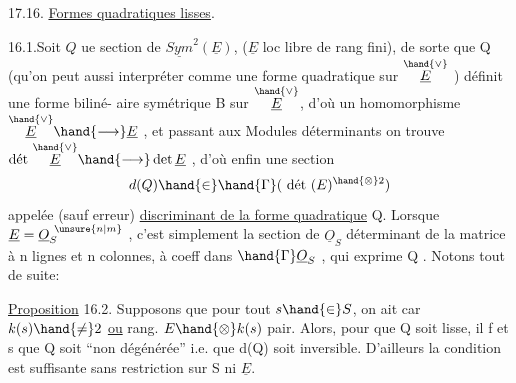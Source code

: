   

17.16. \uline{Formes quadratiques lisses}.

16.1.Soit $Q$ ue section de $\underline{Sym}^2(\underline{E})$, ($\underline{E}$ loc libre de rang fini),
de sorte que Q  (qu'on peut aussi interpréter comme une forme
quadratique sur $\overset{\hand{\vee}}{\underline{E}}$ )  définit une forme biliné-%
aire symétrique B sur $\overset{\hand{\vee}}{\underline{E}}$, d'où un homomorphisme $\overset{\hand{\vee}}{\underline{E}} \hand{\longrightarrow} \underline{E}$ , et passant aux
Modules déterminants on trouve $\text{dét}\ \overset{\hand{\vee}}{\underline{E}} \hand{\longrightarrow} \det \underline{E}$ , d'où enfin une section
\[ d(Q) \hand{\in} \hand{\Gamma}(\ \text{dét}\ (E)^{\hand{\otimes} 2}) \]
appelée (sauf erreur) \uline{discriminant de la forme quadratique} Q. Lorsque
$\underline{E} = \underline{O}_S^{\ \unsure{n|m}}$ , c'est simplement la section de $\underline{O}_S$ déterminant de la matrice
à n lignes et n colonnes, à coeff dans $\hand{\Gamma}\underline{O}_S$ , qui exprime Q . Notons tout
de suite:

\uline{Proposition} 16.2. Supposons que pour tout $s \hand{\in} S$, on ait car $k(s) \hand{\neq} 2$ \uline{ou}
rang. $E\hand{\otimes} k(s)$ pair. Alors, pour que Q soit lisse, il f et s que Q soit
``non dégénérée'' i.e. que d(Q) soit inversible. \hand{(}D'ailleurs la condition est
suffisante sans restriction sur S ni $\underline{E}$\hand{)}.

